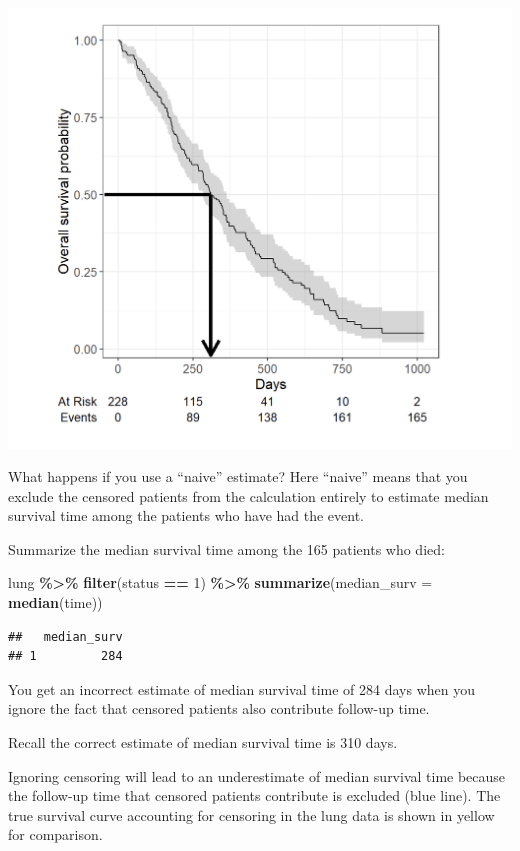 \documentclass[
]{book}
\newenvironment{Shaded}{\begin{snugshade}}{\end{snugshade}}
\newcommand{\AttributeTok}[1]{\textcolor[rgb]{0.13,0.29,0.53}{#1}}
\newcommand{\DecValTok}[1]{\textcolor[rgb]{0.00,0.00,0.81}{#1}}
\newcommand{\FunctionTok}[1]{\textcolor[rgb]{0.13,0.29,0.53}{\textbf{#1}}}
\newcommand{\NormalTok}[1]{#1}
\newcommand{\SpecialCharTok}[1]{\textcolor[rgb]{0.81,0.36,0.00}{\textbf{#1}}}
\begin{document}
\includegraphics{figs/survival5.png}

What happens if you use a ``naive'' estimate? Here ``naive'' means that you exclude the censored patients from the calculation entirely to estimate median survival time among the patients who have had the event.

Summarize the median survival time among the 165 patients who died:

\begin{Shaded}
\begin{Highlighting}[]
\NormalTok{lung }\SpecialCharTok{\%\textgreater{}\%} 
  \FunctionTok{filter}\NormalTok{(status }\SpecialCharTok{==} \DecValTok{1}\NormalTok{) }\SpecialCharTok{\%\textgreater{}\%} 
  \FunctionTok{summarize}\NormalTok{(}\AttributeTok{median\_surv =} \FunctionTok{median}\NormalTok{(time))}
\end{Highlighting}
\end{Shaded}

\begin{verbatim}
##   median_surv
## 1         284
\end{verbatim}

You get an incorrect estimate of median survival time of 284 days when you ignore the fact that censored patients also contribute follow-up time.

Recall the correct estimate of median survival time is 310 days.

Ignoring censoring will lead to an underestimate of median survival time because the follow-up time that censored patients contribute is excluded (blue line). The true survival curve accounting for censoring in the lung data is shown in yellow for comparison.
\end{document}

